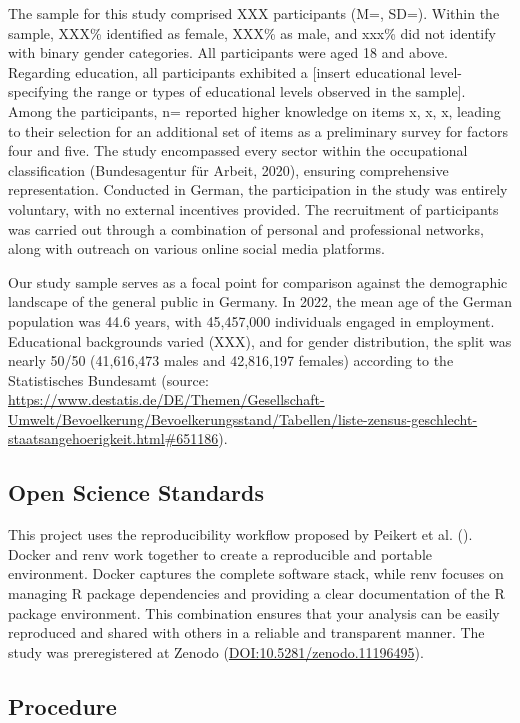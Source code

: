 \documentclass[
  12pt,
  a4paper,
  twoside]{article}
\begin{document}
The sample for this study comprised XXX participants (M=, SD=). Within the sample, XXX\% identified as female, XXX\% as male, and xxx\% did not identify with binary gender categories. All participants were aged 18 and above. Regarding education, all participants exhibited a {[}insert educational level- specifying the range or types of educational levels observed in the sample{]}. Among the participants, n= reported higher knowledge on items x, x, x, leading to their selection for an additional set of items as a preliminary survey for factors four and five.
The study encompassed every sector within the occupational classification (Bundesagentur für Arbeit, 2020), ensuring comprehensive representation. Conducted in German, the participation in the study was entirely voluntary, with no external incentives provided. The recruitment of participants was carried out through a combination of personal and professional networks, along with outreach on various online social media platforms.

Our study sample serves as a focal point for comparison against the demographic landscape of the general public in Germany. In 2022, the mean age of the German population was 44.6 years, with 45,457,000 individuals engaged in employment. Educational backgrounds varied (XXX), and for gender distribution, the split was nearly 50/50 (41,616,473 males and 42,816,197 females) according to the Statistisches Bundesamt (source: \url{https://www.destatis.de/DE/Themen/Gesellschaft-Umwelt/Bevoelkerung/Bevoelkerungsstand/Tabellen/liste-zensus-geschlecht-staatsangehoerigkeit.html\#651186}).

\subsection{Open Science Standards}\label{open-science-standards}

This project uses the reproducibility workflow proposed by Peikert et al. (). Docker and renv work together to create a reproducible and portable
environment. Docker captures the complete software stack, while renv focuses on
managing R package dependencies and providing a clear documentation of the R
package environment. This combination ensures that your analysis can be easily
reproduced and shared with others in a reliable and transparent manner.
The study was preregistered at Zenodo (\url{DOI:10.5281/zenodo.11196495}).

\subsection{Procedure}\label{procedure}
\end{document}
